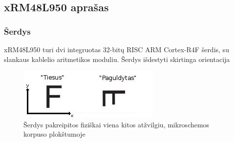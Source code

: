 \documentclass[a4paper, 12pt]{article} %
\begin{document}
\begin{onehalfspacing}
\subsection{xRM48L950 apra\v{s}as}
 
\subsubsection{\v{S}erdys}
xRM48L950 turi dvi integruotas 32-bit\k{u} RISC ARM Cortex-R4F \v{s}erdis, su slankaus kablelio aritmetikos moduliu. \v{S}erdys i\v{s}destyti skirtinga orientacija  
\begin{figure}[H] %
\centering %
\includegraphics[scale=2.5]{pav/orentacija.jpg} %
\captionsetup{labelformat=numbfirst} %
\captionsetup{labelseparator=tarpas}
\caption{\v{S}erdys pakreipitos fizi\v{s}kai viena kitos at\v{z}vilgiu, mikroschemos korpuso plok\v{s}tumoje}
\label{vienas}
\end{figure}


\end{onehalfspacing}
\end{document}
